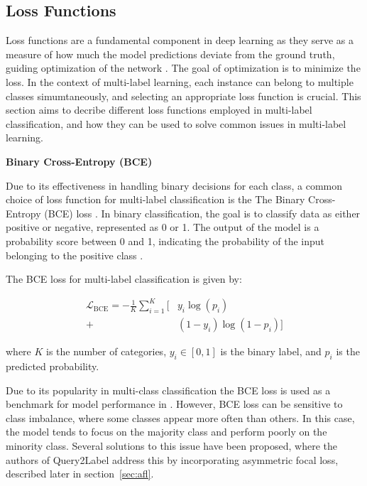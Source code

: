 \documentclass[lettersize,journal]{IEEEtran}
\renewcommand{\paragraph}[1]{%
  \vspace{1.5ex}\textbf{#1}\quad
}
\begin{document}
\subsection{Loss Functions}
Loss functions are a fundamental component in deep learning as they serve as a measure of how much the model predictions deviate from the ground truth, guiding optimization of the network \cite{zhang2023dive}. The goal of optimization is to minimize the loss. In the context of multi-label learning, each instance can belong to multiple classes simumtaneously, and selecting an appropriate loss function is crucial. This section aims to decribe different loss functions employed in multi-label classification, and how they can be used to solve common issues in multi-label learning.

\paragraph{Binary Cross-Entropy (BCE)}
Due to its effectiveness in handling binary decisions for each class, a common choice of loss function for multi-label classification is the The Binary Cross-Entropy (BCE) loss \cite{mlsp,durand2019learningdeepconvnetmultilabel,nayan2024binary}. In binary classification, the goal is to classify data as either positive or negative, represented as 0 or 1. The output of the model is a probability score between 0 and 1, indicating the probability of the input belonging to the positive class \cite{nayan2024binary}.

The BCE loss for multi-label classification is given by:

\begin{equation}
\begin{aligned}
\mathcal{L}_{\text{BCE}} = -\frac{1}{K} \sum_{i=1}^{K} \bigl[ &y_i\log(p_i) \\
+ &(1-y_i)\log(1 - p_i) \bigr]
\end{aligned}
\end{equation}

\noindent where $K$ is the number of categories, $y_i\in[0,1]$ is the binary label, and $p_i$ is the predicted probability.

Due to its popularity in multi-class classification the BCE loss is used as a benchmark for model performance in \cite{mlsp}. However, BCE loss can be sensitive to class imbalance, where some classes appear more often than others. In this case, the model tends to focus on the majority class and perform poorly on the minority class. Several solutions to this issue have been proposed, where the authors of Query2Label address this by incorporating asymmetric focal loss, described later in section~\ref{sec:afl}. 
\end{document}
